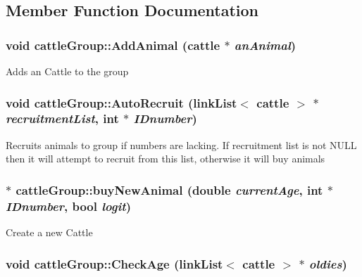 \subsection{Member Function Documentation}
\hypertarget{classcattle_group_ae73c8abf22391b3baee45b5785c20653}{
\subsubsection[{AddAnimal}]{\setlength{\rightskip}{0pt plus 5cm}void cattleGroup::AddAnimal ({\bf cattle} $\ast$ {\em anAnimal})}}
\label{classcattle_group_ae73c8abf22391b3baee45b5785c20653}
Adds an Cattle to the group \hypertarget{classcattle_group_ab4dfc6412c67bd4c37cf793a611418bb}{
\subsubsection[{AutoRecruit}]{\setlength{\rightskip}{0pt plus 5cm}void cattleGroup::AutoRecruit ({\bf linkList}$<$ {\bf cattle} $>$ $\ast$ {\em recruitmentList}, \/  int $\ast$ {\em IDnumber})}}
\label{classcattle_group_ab4dfc6412c67bd4c37cf793a611418bb}
Recruits animals to group if numbers are lacking. If recruitment list is not NULL then it will attempt to recruit from this list, otherwise it will buy animals \hypertarget{classcattle_group_a441a8a788280bfd2330560fae7fd7079}{
\subsubsection[{buyNewAnimal}]{ $\ast$ cattleGroup::buyNewAnimal (double {\em currentAge}, \/  int $\ast$ {\em IDnumber}, \/  bool {\em logit})}}
\label{classcattle_group_a441a8a788280bfd2330560fae7fd7079}
Create a new Cattle \hypertarget{classcattle_group_ab90b18a82f05308c895fd72e5d5447c4}{
\subsubsection[{CheckAge}]{\setlength{\rightskip}{0pt plus 5cm}void cattleGroup::CheckAge ({\bf linkList}$<$ {\bf cattle} $>$ $\ast$ {\em oldies})}}
